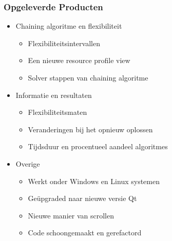 \begin{frame}\frametitle{Opgeleverde Producten}
\begin{itemize}
	\item Chaining algoritme en flexibiliteit
	\begin{itemize}
		\item Flexibiliteitsintervallen
		\item Een nieuwe resource profile view
		\item Solver stappen van chaining algoritme
	\end{itemize}
	
	\item Informatie en resultaten
	\begin{itemize}
		\item Flexibiliteitsmaten
		\item Veranderingen bij het opnieuw oplossen
		\item Tijdsduur en procentueel aandeel algoritmes
	\end{itemize}
	
	\item Overige
	\begin{itemize}
		\item Werkt onder Windows en Linux systemen
		\item Ge\"upgraded naar nieuwe versie Qt
		\item Nieuwe manier van scrollen
		\item Code schoongemaakt en gerefactord
	\end{itemize}
\end{itemize}
\end{frame}
